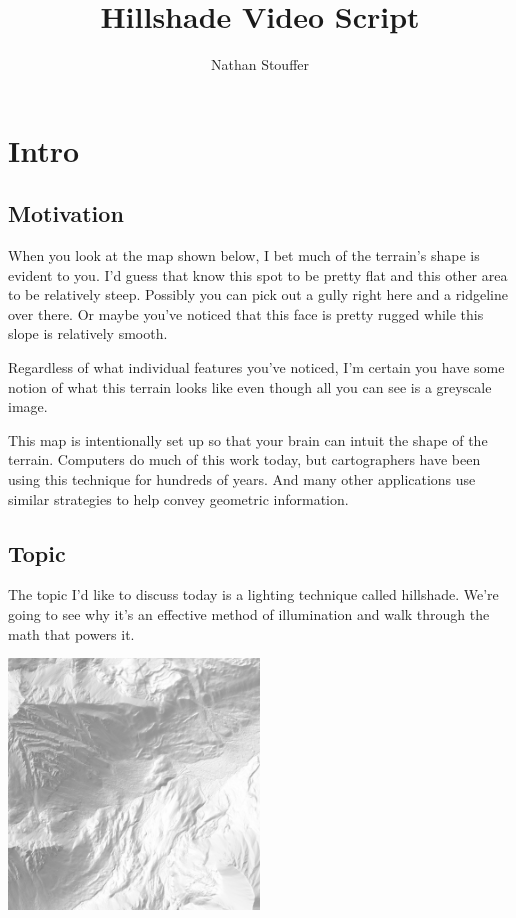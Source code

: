 \documentclass{article}
\begin{document}
	
\title{Hillshade Video Script}
\author{Nathan Stouffer}
\date{}
\maketitle

\section{Intro}

\subsection{Motivation}

When you look at the map shown below, I bet much of the terrain's shape is evident to you.
I'd guess that know this spot to be pretty flat and this other area to be relatively steep.
Possibly you can pick out a gully right here and a ridgeline over there.
Or maybe you've noticed that this face is pretty rugged while this slope is relatively smooth.

Regardless of what individual features you've noticed, I'm certain you have some notion of what this terrain looks like even though all you can see is a greyscale image.

This map is intentionally set up so that your brain can intuit the shape of the terrain.
Computers do much of this work today, but cartographers have been using this technique for hundreds of years.
And many other applications use similar strategies to help convey geometric information.

\subsection{Topic}

The topic I'd like to discuss today is a lighting technique called hillshade.
We're going to see why it's an effective method of illumination and walk through the math that powers it.

\begin{center}
	\includegraphics[width=0.5\textwidth,frame]{assets/hillshade-example.png}
\end{center}
\end{document}
